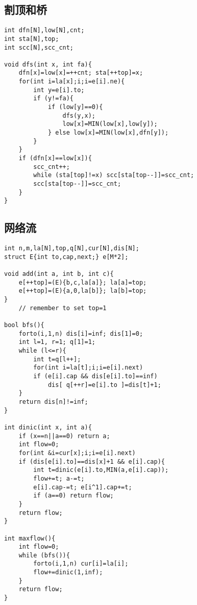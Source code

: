 \documentclass{article}
\begin{document}
\subsection{割顶和桥}
\begin{lstlisting}
int dfn[N],low[N],cnt;
int sta[N],top;
int scc[N],scc_cnt;

void dfs(int x, int fa){
	dfn[x]=low[x]=++cnt; sta[++top]=x;
	for(int i=la[x];i;i=e[i].ne){
		int y=e[i].to;
		if (y!=fa){
			if (low[y]==0){
				dfs(y,x);
				low[x]=MIN(low[x],low[y]);
			} else low[x]=MIN(low[x],dfn[y]);
		}
	}
	if (dfn[x]==low[x]){
		scc_cnt++;
		while (sta[top]!=x) scc[sta[top--]]=scc_cnt;
		scc[sta[top--]]=scc_cnt;
	}	
}
\end{lstlisting}

\subsection{网络流}
\begin{lstlisting}
int n,m,la[N],top,q[N],cur[N],dis[N];
struct E{int to,cap,next;} e[M*2];

void add(int a, int b, int c){
	e[++top]=(E){b,c,la[a]}; la[a]=top;
	e[++top]=(E){a,0,la[b]}; la[b]=top;
}
	// remember to set top=1

bool bfs(){
	forto(i,1,n) dis[i]=inf; dis[1]=0;
	int l=1, r=1; q[1]=1;
	while (l<=r){
		int t=q[l++];
		for(int i=la[t];i;i=e[i].next)
		if (e[i].cap && dis[e[i].to]==inf)
			dis[ q[++r]=e[i].to ]=dis[t]+1;
	}
	return dis[n]!=inf;
}

int dinic(int x, int a){
	if (x==n||a==0) return a;
	int flow=0;
	for(int &i=cur[x];i;i=e[i].next)
	if (dis[e[i].to]==dis[x]+1 && e[i].cap){
		int t=dinic(e[i].to,MIN(a,e[i].cap));
		flow+=t; a-=t;
		e[i].cap-=t; e[i^1].cap+=t;
		if (a==0) return flow;
	}
	return flow;
}

int maxflow(){
	int flow=0;
	while (bfs()){
		forto(i,1,n) cur[i]=la[i];
		flow+=dinic(1,inf);
	}
	return flow;
}
\end{lstlisting}
\end{document}
